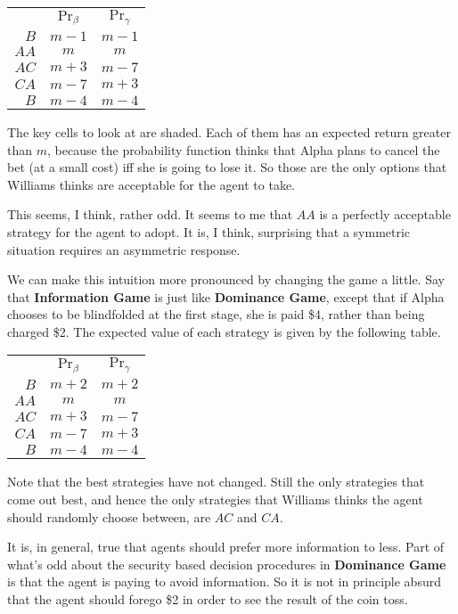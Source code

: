 \begin{center}
\begin{tabular}{r c c}
& $\Pr_\beta$ & $\Pr_\gamma$ \\
$B$ & $m - 1$ & $m - 1$ \\
$AA$ & $m$ & $m$ \\
$AC$ & \cellcolor{lightgray}$m + 3$ & $m - 7$\\
$CA$ & $m - 7$ & \cellcolor{lightgray}$m +3$\\
$B$ & $m - 4$ & $m - 4$
\end{tabular}
\end{center}
The key cells to look at are shaded. Each of them has an expected return greater than $m$, because the probability function thinks that Alpha plans to cancel the bet (at a small cost) iff she is going to lose it. So those are the only options that Williams thinks are acceptable for the agent to take.

This seems, I think, rather odd. It seems to me that $AA$ is a perfectly acceptable strategy for the agent to adopt. It is, I think, surprising that a symmetric situation requires an asymmetric response. 

We can make this intuition more pronounced by changing the game a little. Say that \textbf{Information Game} is just like \textbf{Dominance Game}, except that if Alpha chooses to be blindfolded at the first stage, she is paid \$4, rather than being charged \$2. The expected value of each strategy is given by the following table.

\begin{center}
\begin{tabular}{r c c}
& $\Pr_\beta$ & $\Pr_\gamma$ \\
$B$ & $m + 2$ & $m + 2$ \\
$AA$ & $m$ & $m$ \\
$AC$ & \cellcolor{lightgray}$m + 3$ & $m - 7$\\
$CA$ & $m - 7$ & \cellcolor{lightgray}$m +3$\\
$B$ & $m - 4$ & $m - 4$
\end{tabular}
\end{center}
Note that the best strategies have not changed. Still the only strategies that come out best, and hence the only strategies that Williams thinks the agent should randomly choose between, are $AC$ and $CA$.

It is, in general, true that agents should prefer more information to less. Part of what's odd about the security based decision procedures in \textbf{Dominance Game} is that the agent is paying to avoid information. So it is not in principle absurd that the agent should forego \$2 in order to see the result of the coin toss.

